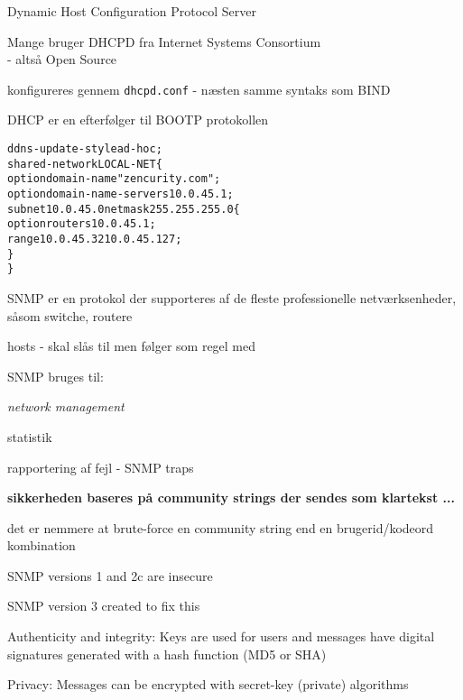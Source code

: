 \documentclass[Screen16to9,17pt]{foils}
\begin{document}

\begin{list1}
\item Dynamic Host Configuration Protocol Server
\item Mange bruger DHCPD fra Internet Systems Consortium\\
   - altså Open Source
\item konfigureres gennem \verb+dhcpd.conf+ - næsten samme syntaks som BIND
\item DHCP er en efterfølger til BOOTP protokollen
\end{list1}

\begin{alltt}
\small
ddns-update-style ad-hoc;
shared-network LOCAL-NET \{
    option  domain-name "zencurity.com";
    option  domain-name-servers 10.0.45.1;
    subnet 10.0.45.0 netmask 255.255.255.0 \{
            option routers 10.0.45.1;
            range 10.0.45.32 10.0.45.127;
    \}
\}
\end{alltt}




\begin{list1}
\item SNMP er en protokol der supporteres af de fleste professionelle
  netværksenheder, såsom switche, routere
\item hosts - skal slås til men følger som regel med
\item SNMP bruges til:
  \begin{list2}
    \item \emph{network management}
    \item statistik
    \item rapportering af fejl - SNMP traps
  \end{list2}
\item {\bfseries sikkerheden baseres på community strings der sendes
    som klartekst ...}
\item det er nemmere at brute-force en community string end en
  brugerid/kodeord kombination
\end{list1}




\begin{list2}
\item SNMP versions 1 and 2c are insecure
\item SNMP version 3 created to fix this
\item Authenticity and integrity: Keys are used for
users and messages have digital signatures
generated with a hash function (MD5 or SHA)
\item Privacy: Messages can be encrypted with
secret-key (private) algorithms
\end{list2}
\end{document}
